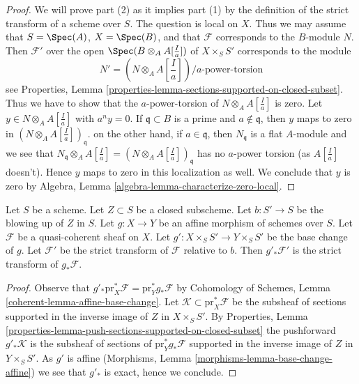 \begin{proof}
We will prove part (2) as it implies part (1) by the definition of the
strict transform of a scheme over $S$. The question is local on $X$.
Thus we may assume that $S = \Spec(A)$, $X = \Spec(B)$, and that
$\mathcal{F}$ corresponds to the $B$-module $N$. Then $\mathcal{F}'$
over the open $\Spec(B \otimes_A A[\frac{I}{a}])$ of $X \times_S S'$
corresponds to the module
$$
N' = (N \otimes_A A[\textstyle{\frac{I}{a}}])/a\text{-power-torsion}
$$
see Properties, Lemma
\ref{properties-lemma-sections-supported-on-closed-subset}.
Thus we have to show that the $a$-power-torsion of
$N \otimes_A A[\frac{I}{a}]$ is zero. Let $y \in N \otimes_A A[\frac{I}{a}]$
with $a^n y = 0$. If $\mathfrak q \subset B$
is a prime and $a \not \in \mathfrak q$, then $y$ maps to
zero in $(N \otimes_A A[\frac{I}{a}])_\mathfrak q$. on the other hand,
if $a \in \mathfrak q$, then $N_\mathfrak q$ is a flat $A$-module
and we see that
$N_\mathfrak q \otimes_A A[\frac{I}{a}]
=(N \otimes_A A[\frac{I}{a}])_\mathfrak q$
has no $a$-power torsion (as $A[\frac{I}{a}]$ doesn't).
Hence $y$ maps to zero in this localization as well. We conclude that
$y$ is zero by
Algebra, Lemma \ref{algebra-lemma-characterize-zero-local}.
\end{proof}

\begin{lemma}
\label{lemma-strict-transform-affine}
Let $S$ be a scheme. Let $Z \subset S$ be a closed subscheme.
Let $b : S' \to S$ be the blowing up of $Z$ in $S$. Let
$g : X \to Y$ be an affine morphism of schemes over $S$.
Let $\mathcal{F}$ be a quasi-coherent sheaf on $X$.
Let $g' : X \times_S S' \to Y \times_S S'$ be the base change
of $g$. Let $\mathcal{F}'$ be the strict transform of $\mathcal{F}$
relative to $b$. Then $g'_*\mathcal{F}'$ is the strict transform
of $g_*\mathcal{F}$.
\end{lemma}

\begin{proof}
Observe that $g'_*\text{pr}_X^*\mathcal{F} = \text{pr}_Y^*g_*\mathcal{F}$
by Cohomology of Schemes, Lemma \ref{coherent-lemma-affine-base-change}.
Let $\mathcal{K} \subset \text{pr}_X^*\mathcal{F}$ be the subsheaf
of sections supported in the inverse image of $Z$ in $X \times_S S'$.
By Properties, Lemma
\ref{properties-lemma-push-sections-supported-on-closed-subset}
the pushforward $g'_*\mathcal{K}$ is the subsheaf of sections of
$\text{pr}_Y^*g_*\mathcal{F}$ supported in the inverse
image of $Z$ in $Y \times_S S'$. As $g'$ is affine
(Morphisms, Lemma \ref{morphisms-lemma-base-change-affine})
we see that $g'_*$ is exact, hence we conclude.
\end{proof}

